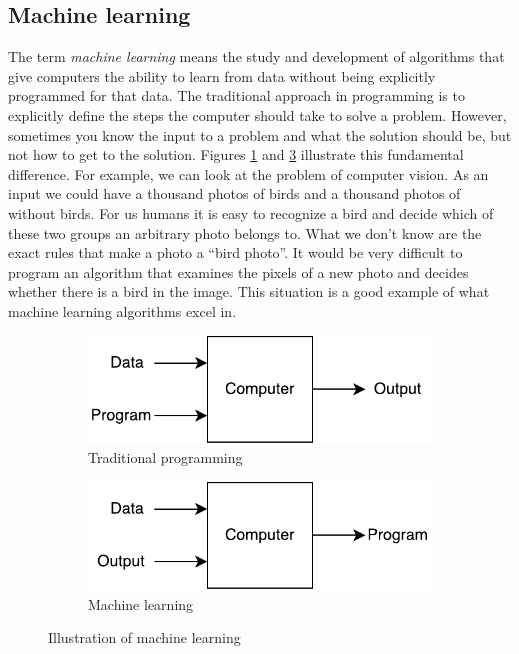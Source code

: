 
\subsection{Machine learning}

The term \textit{machine learning} means the study and development of algorithms that give computers the ability to learn from data without being explicitly programmed for that data. 
The traditional approach in programming is to explicitly define the steps the computer should take to solve a problem.
However, sometimes you know the input to a problem and what the solution should be, but not how to get to the solution.
Figures \ref{fig:traditionalvs} and \ref{fig:mlvs} illustrate this fundamental difference.
For example, we can look at the problem of computer vision.
As an input we could have a thousand photos of birds and a thousand photos of without birds.
For us humans it is easy to recognize a bird and decide which of these two groups an arbitrary photo belongs to.
What we don't know are the exact rules that make a photo a ``bird photo''.
It would be very difficult to program an algorithm that examines the pixels of a new photo and decides whether there is a bird in the image.
This situation is a good example of what machine learning algorithms excel in.

\begin{figure}[htb!]
    \centering
    \begin{subfigure}[h]{0.4\linewidth}
        \centering \includegraphics[width=\linewidth]{gfx/figures/traditionalvs.pdf}
        \caption{Traditional programming}
        \label{fig:traditionalvs}
    \end{subfigure}
    \begin{subfigure}[h]{0.4\linewidth}
        \centering \includegraphics[width=\linewidth]{gfx/figures/machinevs.pdf}
        \caption{Machine learning}
        \label{fig:mlvs}
    \end{subfigure}
    \caption{Illustration of machine learning}
\end{figure}

